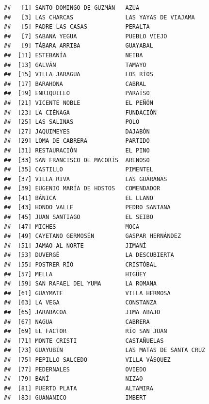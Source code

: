\documentclass[11pt,]{article}
\begin{document}
\begin{verbatim}
##   [1] SANTO DOMINGO DE GUZMÁN   AZUA                     
##   [3] LAS CHARCAS               LAS YAYAS DE VIAJAMA     
##   [5] PADRE LAS CASAS           PERALTA                  
##   [7] SABANA YEGUA              PUEBLO VIEJO             
##   [9] TÁBARA ARRIBA             GUAYABAL                 
##  [11] ESTEBANÍA                 NEIBA                    
##  [13] GALVÁN                    TAMAYO                   
##  [15] VILLA JARAGUA             LOS RÍOS                 
##  [17] BARAHONA                  CABRAL                   
##  [19] ENRIQUILLO                PARAÍSO                  
##  [21] VICENTE NOBLE             EL PEÑÓN                 
##  [23] LA CIÉNAGA                FUNDACIÓN                
##  [25] LAS SALINAS               POLO                     
##  [27] JAQUIMEYES                DAJABÓN                  
##  [29] LOMA DE CABRERA           PARTIDO                  
##  [31] RESTAURACIÓN              EL PINO                  
##  [33] SAN FRANCISCO DE MACORÍS  ARENOSO                  
##  [35] CASTILLO                  PIMENTEL                 
##  [37] VILLA RIVA                LAS GUÁRANAS             
##  [39] EUGENIO MARÍA DE HOSTOS   COMENDADOR               
##  [41] BÁNICA                    EL LLANO                 
##  [43] HONDO VALLE               PEDRO SANTANA            
##  [45] JUAN SANTIAGO             EL SEIBO                 
##  [47] MICHES                    MOCA                     
##  [49] CAYETANO GERMOSÉN         GASPAR HERNÁNDEZ         
##  [51] JAMAO AL NORTE            JIMANÍ                   
##  [53] DUVERGÉ                   LA DESCUBIERTA           
##  [55] POSTRER RÍO               CRISTÓBAL                
##  [57] MELLA                     HIGÜEY                   
##  [59] SAN RAFAEL DEL YUMA       LA ROMANA                
##  [61] GUAYMATE                  VILLA HERMOSA            
##  [63] LA VEGA                   CONSTANZA                
##  [65] JARABACOA                 JIMA ABAJO               
##  [67] NAGUA                     CABRERA                  
##  [69] EL FACTOR                 RÍO SAN JUAN             
##  [71] MONTE CRISTI              CASTAÑUELAS              
##  [73] GUAYUBÍN                  LAS MATAS DE SANTA CRUZ  
##  [75] PEPILLO SALCEDO           VILLA VÁSQUEZ            
##  [77] PEDERNALES                OVIEDO                   
##  [79] BANÍ                      NIZAO                    
##  [81] PUERTO PLATA              ALTAMIRA                 
##  [83] GUANANICO                 IMBERT                   

\end{verbatim}
\end{document}
